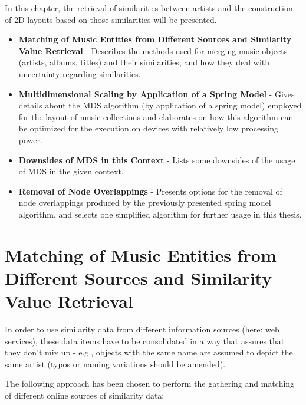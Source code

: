 In this chapter, the retrieval of similarities between artists and the construction of 2D layouts based on those similarities will be presented.

\begin{itemize}
	\item \textbf {Matching of Music Entities from Different Sources and Similarity Value Retrieval} - Describes the methods used for merging music objects (artists, albums, titles) and their similarities, and how they deal with uncertainty regarding similarities.
	\item \textbf {Multidimensional Scaling by Application of a Spring Model} - Gives details about the MDS algorithm (by application of a spring model) employed for the layout of music collections and elaborates on how this algorithm can be optimized for the execution on devices with relatively low processing power.
	\item \textbf {Downsides of MDS in this Context} - Lists some downsides of the usage of MDS in the given context.
	\item \textbf {Removal of Node Overlappings} - Presents options for the removal of node overlappings produced by the previously presented spring model algorithm, and selects one simplified algorithm for further usage in this thesis.
\end{itemize}

\section{Matching of Music Entities from Different Sources and Similarity Value Retrieval}
\label{sec:matching-music-entities}

In order to use similarity data from different information sources (here: web services), these data items have to be consolidated in a way that assures that they don't mix up - e.g., objects with the same name are assumed to depict the same artist (typos or naming variations should be amended).

The following approach has been chosen to perform the gathering and matching of different online sources of similarity data:

